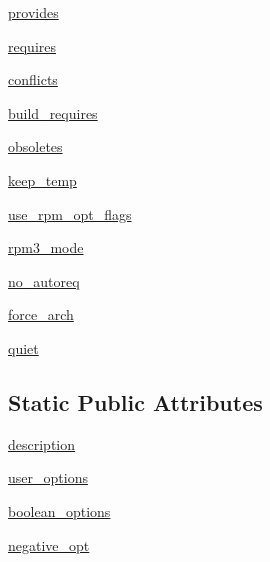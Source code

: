 \begin{DoxyCompactItemize}
\item 
\hyperlink{classsetuptools_1_1__distutils_1_1command_1_1bdist__rpm_1_1bdist__rpm_a1b5acea147c6727d2ac453e083ea560f}{provides}
\item 
\hyperlink{classsetuptools_1_1__distutils_1_1command_1_1bdist__rpm_1_1bdist__rpm_ac5ad6f66157f3ce0483992e224b2fcc4}{requires}
\item 
\hyperlink{classsetuptools_1_1__distutils_1_1command_1_1bdist__rpm_1_1bdist__rpm_abd9b3dfc1baefd41cddd64d8ed4ea19a}{conflicts}
\item 
\hyperlink{classsetuptools_1_1__distutils_1_1command_1_1bdist__rpm_1_1bdist__rpm_a1533f9d56503169e15abc798aa2601e5}{build\+\_\+requires}
\item 
\hyperlink{classsetuptools_1_1__distutils_1_1command_1_1bdist__rpm_1_1bdist__rpm_aa534d46c0c15ab041f0110707d2d6545}{obsoletes}
\item 
\hyperlink{classsetuptools_1_1__distutils_1_1command_1_1bdist__rpm_1_1bdist__rpm_a03fcb71c31064b6964220268a9b69d85}{keep\+\_\+temp}
\item 
\hyperlink{classsetuptools_1_1__distutils_1_1command_1_1bdist__rpm_1_1bdist__rpm_a23dc4afb4b40e54985264de35fc07f55}{use\+\_\+rpm\+\_\+opt\+\_\+flags}
\item 
\hyperlink{classsetuptools_1_1__distutils_1_1command_1_1bdist__rpm_1_1bdist__rpm_a6f089085fba9e08731259818f95aa744}{rpm3\+\_\+mode}
\item 
\hyperlink{classsetuptools_1_1__distutils_1_1command_1_1bdist__rpm_1_1bdist__rpm_a101d1b844028c2cd01b97eefc0590810}{no\+\_\+autoreq}
\item 
\hyperlink{classsetuptools_1_1__distutils_1_1command_1_1bdist__rpm_1_1bdist__rpm_abc478baea6a0c6ef006e6badd42f85b1}{force\+\_\+arch}
\item 
\hyperlink{classsetuptools_1_1__distutils_1_1command_1_1bdist__rpm_1_1bdist__rpm_a2272330f1399a64c3d414cf02a0b8949}{quiet}
\end{DoxyCompactItemize}
\subsection*{Static Public Attributes}
\begin{DoxyCompactItemize}
\item 
\hyperlink{classsetuptools_1_1__distutils_1_1command_1_1bdist__rpm_1_1bdist__rpm_ad8c8643ac7ec6fd805df7470aed1e667}{description}
\item 
\hyperlink{classsetuptools_1_1__distutils_1_1command_1_1bdist__rpm_1_1bdist__rpm_a6b45db8617e9df1bafc78eedadda215d}{user\+\_\+options}
\item 
\hyperlink{classsetuptools_1_1__distutils_1_1command_1_1bdist__rpm_1_1bdist__rpm_ab95dde962c2294d3099ea3d132ad2c8f}{boolean\+\_\+options}
\item 
\hyperlink{classsetuptools_1_1__distutils_1_1command_1_1bdist__rpm_1_1bdist__rpm_a4e885a87111ae39747fcb788b9d069c9}{negative\+\_\+opt}
\end{DoxyCompactItemize}



